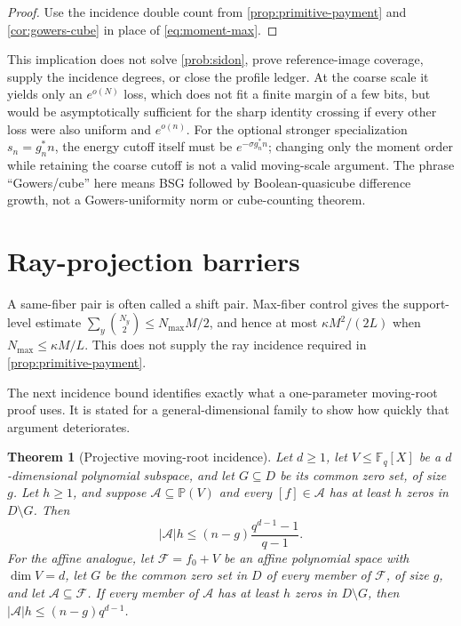\documentclass[a4paper,11pt]{amsart}
\newtheorem{theorem}{Theorem}[section]
\theoremstyle{remark}
\newcommand{\F}{\mathbb F}
\newcommand{\abs}[1]{\lvert#1\rvert}
\begin{document}
\begin{proof}
Use the incidence double count from \cref{prop:primitive-payment} and
\cref{cor:gowers-cube} in place of \eqref{eq:moment-max}.
\end{proof}

This implication does not solve \cref{prob:sidon}, prove reference-image
coverage, supply the incidence degrees, or close the profile ledger.  At the
coarse scale it yields only an \(e^{o(N)}\) loss, which does not fit a finite
margin of a few bits, but would be asymptotically sufficient for the sharp
identity crossing if every other loss were also uniform and \(e^{o(n)}\).
For the optional stronger specialization \(s_n=g_n^*n\), the energy cutoff
itself must be \(e^{-\sigma g_n^*n}\); changing only the moment order while
retaining the coarse cutoff is not a valid moving-scale argument.  The phrase
``Gowers/cube'' here means BSG followed by Boolean-quasicube difference
growth, not a Gowers-uniformity norm or cube-counting theorem.


\section{Ray-projection barriers}\label{sec:rays}

A same-fiber pair is often called a shift pair.  Max-fiber control gives the
support-level estimate
\(\sum_y\binom{N_y}{2}\le N_{\max}M/2\), and hence at most
\(\kappa M^2/(2L)\) when \(N_{\max}\le\kappa M/L\).  This does not supply
the ray incidence required in \cref{prop:primitive-payment}.

The next incidence bound identifies exactly what a one-parameter
moving-root proof uses.  It is stated for a general-dimensional family to
show how quickly that argument deteriorates.

\begin{theorem}[Projective moving-root incidence]\label{thm:projective-incidence}
Let \(d\ge1\), let \(V\le\F_q[X]\) be a \(d\)-dimensional polynomial subspace, and let
\(G\subseteq D\) be its common zero set, of size \(g\).  Let \(h\ge1\), and suppose
\(\mathcal A\subseteq\mathbb P(V)\) and every \([f]\in\mathcal A\) has at
least \(h\) zeros in \(D\setminus G\).  Then
\[
 \abs{\mathcal A}h\le(n-g)\frac{q^{d-1}-1}{q-1}.    \tag{4.1}\label{eq:projective-incidence}
\]
For the affine analogue, let \(\mathcal F=f_0+V\) be an affine polynomial
space with \(\dim V=d\), let \(G\) be the common zero set in \(D\) of every
member of \(\mathcal F\), of size \(g\), and let
\(\mathcal A\subseteq\mathcal F\).  If
every member of \(\mathcal A\) has at least \(h\) zeros in \(D\setminus G\),
then \(\abs{\mathcal A}h\le(n-g)q^{d-1}\).
\end{theorem}
\end{document}
